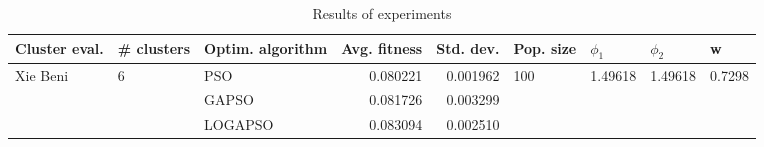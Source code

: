 \begin{table}
\centering
\caption{Results of experiments}
\begin{tabular}{lllrrllll}
\toprule
            Cluster eval. &        \# clusters & Optim. algorithm &  Avg. fitness &  Std. dev. &            Pop. size &               $\phi_{1}$ &               $\phi_{2}$ &                       w \\
\midrule
\multirow{3}{*}{Xie Beni} & \multirow{3}{*}{6} &              PSO &      0.080221 &   0.001962 & \multirow{3}{*}{100} & \multirow{3}{*}{1.49618} & \multirow{3}{*}{1.49618} & \multirow{3}{*}{0.7298} \\
                          &                    &            GAPSO &      0.081726 &   0.003299 &                      &                          &                          &                         \\
                          &                    &          LOGAPSO &      0.083094 &   0.002510 &                      &                          &                          &                         \\
\bottomrule
\end{tabular}
\end{table}
